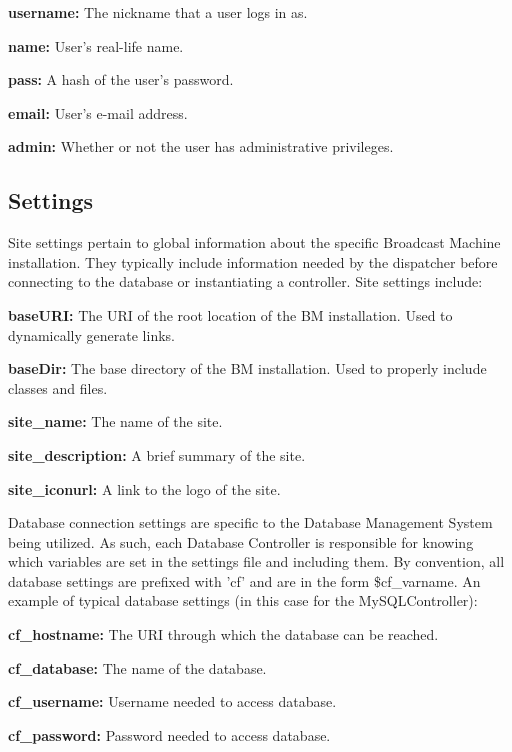 \documentclass[a4paper,12pt]{report}
\begin{document}
\begin{description}
\item{\textbf{username: } The nickname that a user logs in as.}
\item{\textbf{name: } User's real-life name.}
\item{\textbf{pass: } A hash of the user's password.}
\item{\textbf{email: } User's e-mail address.}
\item{\textbf{admin: } Whether or not the user has administrative privileges.} \\
\end{description}

\subsection*{Settings}

Site settings pertain to global information about the specific Broadcast Machine installation. They typically include information needed by the dispatcher before connecting to the database or instantiating a controller. Site settings include:

\begin{description}
\item{\textbf{baseURI: } The URI of the root location of the BM installation. Used to dynamically generate links.}
\item{\textbf{baseDir: } The base directory of the BM installation. Used to properly include classes and files.}
\item{\textbf{site\_name: } The name of the site.}
\item{\textbf{site\_description: } A brief summary of the site.}
\item{\textbf{site\_iconurl: } A link to the logo of the site.} \\
\end{description}

Database connection settings are specific to the Database Management System being utilized. As such, each Database Controller is responsible for knowing which variables are set in the settings file and including them. By convention, all database settings are prefixed with 'cf' and are in the form \$cf\_varname. An example of typical database settings (in this case for the MySQLController): \\

\begin{description}
\item{\textbf{cf\_hostname: } The URI through which the database can be reached.}
\item{\textbf{cf\_database: } The name of the database.}
\item{\textbf{cf\_username: } Username needed to access database.}
\item{\textbf{cf\_password: } Password needed to access database.} \\
\end{description}
\end{document}
